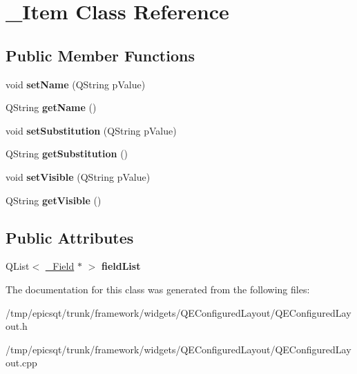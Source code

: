 \hypertarget{class__Item}{
\section{\_\-Item Class Reference}
\label{class__Item}
}
\subsection*{Public Member Functions}
\begin{DoxyCompactItemize}
\item 
\hypertarget{class__Item_a97705763474739d80755a8c2d8c4c353}{
void {\bfseries setName} (QString pValue)}
\label{class__Item_a97705763474739d80755a8c2d8c4c353}

\item 
\hypertarget{class__Item_a6a3dadcb13caca7b4f4ac8ffc7ef1faf}{
QString {\bfseries getName} ()}
\label{class__Item_a6a3dadcb13caca7b4f4ac8ffc7ef1faf}

\item 
\hypertarget{class__Item_a4102dfeffc9d48036252d20f97fd98ee}{
void {\bfseries setSubstitution} (QString pValue)}
\label{class__Item_a4102dfeffc9d48036252d20f97fd98ee}

\item 
\hypertarget{class__Item_a7dc4b49737ac6e60e5938d680d230e5f}{
QString {\bfseries getSubstitution} ()}
\label{class__Item_a7dc4b49737ac6e60e5938d680d230e5f}

\item 
\hypertarget{class__Item_a0ba5d71db04508efed1ba5529f82e415}{
void {\bfseries setVisible} (QString pValue)}
\label{class__Item_a0ba5d71db04508efed1ba5529f82e415}

\item 
\hypertarget{class__Item_a57a6a1f0bdee26464926db7d005baa4f}{
QString {\bfseries getVisible} ()}
\label{class__Item_a57a6a1f0bdee26464926db7d005baa4f}

\end{DoxyCompactItemize}
\subsection*{Public Attributes}
\begin{DoxyCompactItemize}
\item 
\hypertarget{class__Item_ad548f01bc796e771a708d8798e77fe89}{
QList$<$ \hyperlink{class__Field}{\_\-Field} $\ast$ $>$ {\bfseries fieldList}}
\label{class__Item_ad548f01bc796e771a708d8798e77fe89}

\end{DoxyCompactItemize}


The documentation for this class was generated from the following files:\begin{DoxyCompactItemize}
\item 
/tmp/epicsqt/trunk/framework/widgets/QEConfiguredLayout/QEConfiguredLayout.h\item 
/tmp/epicsqt/trunk/framework/widgets/QEConfiguredLayout/QEConfiguredLayout.cpp\end{DoxyCompactItemize}
